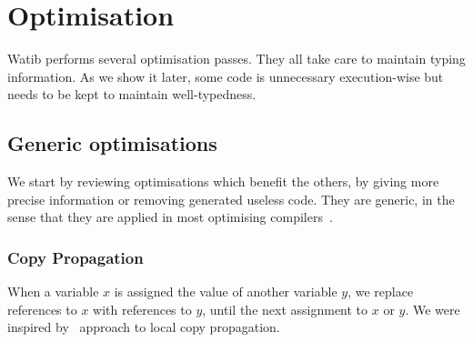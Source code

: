 \documentclass[a4paper,11pt]{article}
\begin{document}
\section{Optimisation}\label{opt}
\textsf{Watib} performs several optimisation passes. They all take care to
maintain typing information. As we show it later, some code is unnecessary
execution-wise but needs to be kept to maintain well-typedness.

\subsection{Generic optimisations}
We start by reviewing optimisations which benefit the others, by giving more
precise information or removing generated useless code. They are generic, in the
sense that they are applied in most optimising
compilers~\cite{muchnick1997advanced}.

\subsubsection{Copy Propagation}
When a variable $x$ is assigned the value of another variable $y$, we replace
references to $x$ with references to $y$, until the next assignment to $x$ or
$y$. We were inspired by~\cite[Section~12.5]{muchnick1997advanced} approach to
local copy propagation.
\end{document}
